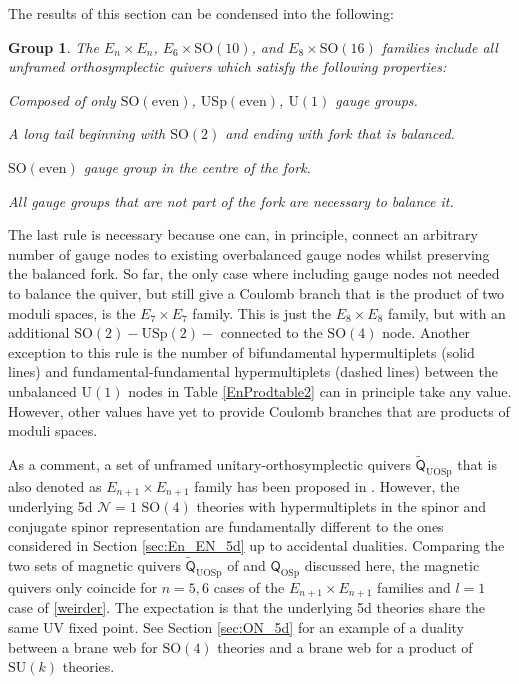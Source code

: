 \documentclass[a4paper,11pt]{article}
\newtheorem{myrule}{Group}
\newcommand{\Ncal}{\mathcal{N}}
\newcommand{\urm}{\mathrm{U}}
\newcommand{\surm}{\mathrm{SU}}
\newcommand{\usprm}{\mathrm{USp}}
\newcommand{\sorm}{\mathrm{SO}}
\begin{document}
The results of this section can be condensed into the following:
\begin{tcolorbox}
\begin{myrule} \label{rule:En}
The $E_n \times E_n$, $E_6\times \sorm(10)$, and $ E_8 \times \sorm(16) $ families include all \emph{unframed} orthosymplectic quivers which satisfy the following properties:
\begin{compactitem}
    \item Composed of only $\sorm(\mathrm{even})$, $\usprm(\mathrm{even})$, $\urm(1)$ gauge groups.
    \item A long tail beginning with $\sorm(2)$ and ending with fork that is balanced.
    \item $\sorm(\mathrm{even})$ gauge group in the centre of the fork.
    \item All gauge groups that are not part of the fork are necessary to balance it.
\end{compactitem}
\end{myrule}
\end{tcolorbox}
\noindent
The last rule is necessary because one can, in principle, connect an arbitrary number of gauge nodes to existing overbalanced gauge nodes whilst preserving the balanced fork. So far, the only case where including gauge nodes not needed to balance the quiver, but still give a Coulomb branch that is the product of two moduli spaces, is the $E_7\times E_7$ family. This is just the $E_8\times E_8$ family, but with an additional $\sorm(2) - \usprm(2)-$ connected to the $\sorm(4)$ node. Another exception to this rule is the number of bifundamental hypermultiplets (solid lines) and fundamental-fundamental hypermultiplets (dashed lines) between the unbalanced $\urm(1)$ nodes in Table \ref{EnProdtable2} can in principle take any value. However, other values have yet to provide Coulomb branches that are products of moduli spaces.

As a comment, a set of unframed unitary-orthosymplectic quivers $\widetilde{\mathsf{Q}}_{\mathrm{UOSp}}$ that is also denoted as $E_{n+1}\times E_{n+1}$ family has been proposed in \cite{Akhond:2021knl}. However, the underlying 5d $\Ncal=1$ $\sorm(4)$ theories with hypermultiplets in the spinor and conjugate spinor representation are fundamentally different to the ones considered in Section \ref{sec:En_EN_5d} up to accidental dualities. Comparing the two sets of magnetic quivers $\widetilde{\mathsf{Q}}_{\mathrm{UOSp}}$ of \cite{Akhond:2021knl} and $\mathsf{Q}_{\mathrm{OSp}}$ discussed here, the magnetic quivers only coincide for $n=5,6$ cases of the $E_{n+1} \times E_{n+1}$ families and $l=1$ case of \eqref{weirder}. The expectation is that the underlying 5d theories share the same UV fixed point. See Section \ref{sec:ON_5d} for an example of a duality between a brane web for $\sorm(4)$ theories and a brane web for a product of $\surm(k)$ theories. 
\end{document}

